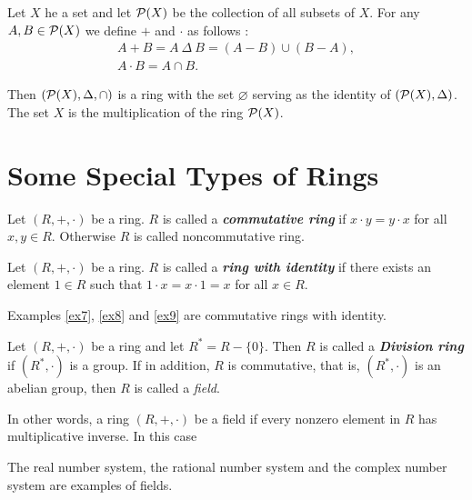 \begin{example}
\label{ex9}
    Let \(X\) he a set and let \(\mathcal{P}(X)\)  be the collection of all subsets of \(X\). For any \(A,B \in \mathcal{P}(X)\) we define \(+\) and \(\cdot\) as follows :
    \begin{gather*}
    A+B = A\:\Delta\:B =(A-B)\cup (B-A),\\
    A\cdot B= A\cap B.
    \end{gather*}
    
    Then \((\mathcal{P}(X),\Delta,\cap)\) is a ring with the set \(\varnothing\)  serving as the identity of \((\mathcal{P}(X),\Delta)\). The set \(X\) is the multiplication of the ring \(\mathcal{P}(X)\).
\end{example}

\section{Some Special Types of Rings}

\begin{mydef}
    Let \((R,+,\cdot)\) be a ring. \(R\) is called a \textit{\textbf{commutative ring}} if \(x\cdot y=y\cdot x\) for all \(x,y \in R\). Otherwise \(R\) is called noncommutative ring.
\end{mydef}

\begin{mydef}
    Let \((R,+,\cdot)\) be a ring. \(R\) is called a \textit{\textbf{ring with identity}} if there exists an element \(1 \in R\) such that \(1\cdot x=x\cdot 1=x\) for all \(x\in R\).
\end{mydef}

Examples \ref{ex7}, \ref{ex8} and \ref{ex9} are commutative rings with identity.

\begin{mydef}
    Let \((R,+,\cdot)\) be a ring and let \(R^*=R-\{0\}\). Then \(R\) is called a \textit{\textbf{Division ring}} if \((R^*,\cdot)\) is a group. If in addition, \(R\) is commutative, that is, \((R^*,\cdot)\) is an abelian group, then \(R\) is called a \textit{field}.
\end{mydef}

In other words, a ring \((R,+,\cdot)\) be a field if every nonzero element in \(R\) has multiplicative inverse. In this case 

\begin{example}
    The real number system, the rational number system and the complex number system are examples of fields.
\end{example}


